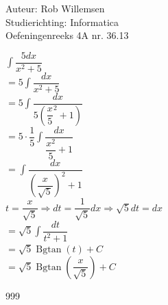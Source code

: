 \documentclass[a4paper]{article}
\newcommand{\dint}{\displaystyle\int}
\newcommand{\Bgtan}{\operatorname{Bgtan}}
\begin{document}
\noindent \large Auteur: Rob Willemsen \\
\noindent \large Studierichting: Informatica \\
\noindent \large Oefeningenreeks 4A nr. 36.13 \\

\medskip

\normalsize

$\dint \dfrac{5dx}{x^2+5}$ \\

$= 5 \dint \dfrac{dx}{x^2+5}$ \\

$= 5 \dint \dfrac{dx}{5\left(\dfrac{x}{5}^2+1\right)}$ \\

$= 5 \cdot \dfrac{1}{5} \dint \dfrac{dx}{\dfrac{x^2}{5}+1}$ \\

$= \dint \dfrac{dx}{\left(\dfrac{x}{\sqrt{5}}\right)^2+1}$ \\

$t = \dfrac{x}{\sqrt{5}} \Rightarrow dt = \dfrac{1}{\sqrt{5}} dx \Rightarrow \sqrt{5}dt = dx$ \\

$= \sqrt{5} \dint \dfrac{dt}{t^2+1}$ \\

$= \sqrt{5} \Bgtan(t) + C$ \\

$= \sqrt{5} \Bgtan\left(\dfrac{x}{\sqrt{5}}\right) + C$ \\

\begin{thebibliography}{999}
\end{thebibliography}
\end{document}
